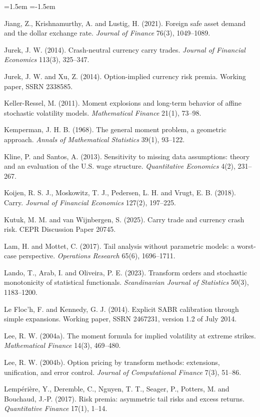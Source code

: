 \documentclass[11pt]{article}
\theoremstyle{result}
\begin{document}
\begin{list}{}{\leftmargin=1.5em \itemindent=-1.5em \itemsep=2pt \parsep=0pt}
\item Jiang, Z., Krishnamurthy, A. and Lustig, H. (2021). Foreign safe asset demand and the dollar exchange rate. \emph{Journal of Finance} 76(3), 1049--1089.
\item Jurek, J. W. (2014). Crash-neutral currency carry trades. \emph{Journal of Financial Economics} 113(3), 325--347.
\item Jurek, J. W. and Xu, Z. (2014). Option-implied currency risk premia. Working paper, SSRN 2338585.
\item Keller-Ressel, M. (2011). Moment explosions and long-term behavior of affine stochastic volatility models. \emph{Mathematical Finance} 21(1), 73--98.
\item Kemperman, J. H. B. (1968). The general moment problem, a geometric approach. \emph{Annals of Mathematical Statistics} 39(1), 93--122.
\item Kline, P. and Santos, A. (2013). Sensitivity to missing data assumptions: theory and an evaluation of the U.S. wage structure. \emph{Quantitative Economics} 4(2), 231--267.
\item Koijen, R. S. J., Moskowitz, T. J., Pedersen, L. H. and Vrugt, E. B. (2018). Carry. \emph{Journal of Financial Economics} 127(2), 197--225.
\item Kutuk, M. M. and van Wijnbergen, S. (2025). Carry trade and currency crash risk. CEPR Discussion Paper 20745.
\item Lam, H. and Mottet, C. (2017). Tail analysis without parametric models: a worst-case perspective. \emph{Operations Research} 65(6), 1696--1711.
\item Lando, T., Arab, I. and Oliveira, P. E. (2023). Transform orders and stochastic monotonicity of statistical functionals. \emph{Scandinavian Journal of Statistics} 50(3), 1183--1200.
\item Le Floc'h, F. and Kennedy, G. J. (2014). Explicit SABR calibration through simple expansions. Working paper, SSRN 2467231, version 1.2 of July 2014.
\item Lee, R. W. (2004a). The moment formula for implied volatility at extreme strikes. \emph{Mathematical Finance} 14(3), 469--480.
\item Lee, R. W. (2004b). Option pricing by transform methods: extensions, unification, and error control. \emph{Journal of Computational Finance} 7(3), 51--86.
\item Lemp\'eri\`ere, Y., Deremble, C., Nguyen, T. T., Seager, P., Potters, M. and Bouchaud, J.-P. (2017). Risk premia: asymmetric tail risks and excess returns. \emph{Quantitative Finance} 17(1), 1--14.

\end{list}
\end{document}
